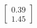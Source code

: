\documentclass[preview]{standalone}
\begin{document}
\begin{align*}
\begin{bmatrix} 0.39 \\ 1.45 \end{bmatrix}
\end{align*}
\end{document}
